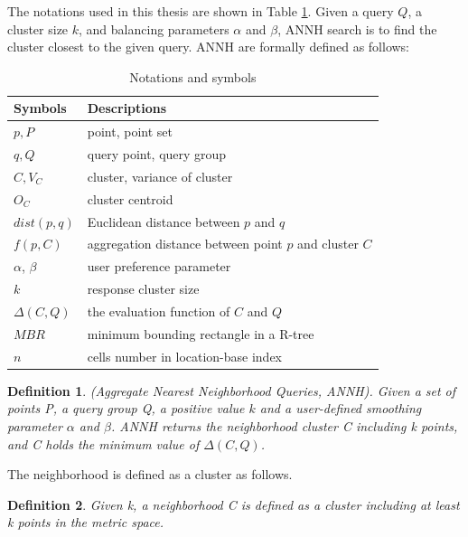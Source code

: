 \documentclass[a4paper,11pt]{report}
\theoremstyle{mytheoremstyle}
\newtheorem{definition}{Definition}
\begin{document}
The notations used in this thesis are shown in Table \ref{tab:var}. Given a query $Q$, a cluster size $k$, and balancing parameters $\alpha$ and $\beta$, ANNH search is to find the cluster closest to the given query. ANNH are formally defined as follows:

\begin{table}
  \begin{center}
  \caption{Notations and symbols}
    \begin{tabular}{|l|l|} \hline
      Symbols & Descriptions \\ \hline \hline
      $p, P$ & point, point set \\ \hline
      $q, Q$ & query point, query group \\ \hline
      $C, V_C$ & cluster, variance of cluster \\ \hline
      $O_C$ & cluster centroid \\ \hline
      $dist(p,q)$ & Euclidean distance between $p$ and $q$ \\ \hline
      $f(p, C)$  & aggregation distance between point $p$ and cluster $C$ \\ \hline
      $\alpha$, $\beta$ & user preference parameter \\ \hline
      $k$ & response cluster size \\ \hline
      $\Delta(C,Q)$ & the evaluation function of $C$ and $Q$ \\ \hline
      $MBR$ & minimum bounding rectangle in a R-tree \\ \hline
      $n$ & cells number in location-base index \\ \hline
    \end{tabular}
    \label{tab:var}
  \end{center}
\end{table}

\begin{definition}
(Aggregate Nearest Neighborhood Queries, ANNH). Given a set of points P, a query group Q, a positive value $k$ and a user-defined smoothing parameter $\alpha$ and $\beta$. ANNH returns the neighborhood cluster C including k points, and C holds the minimum value of $\Delta(C, Q)$.
\end{definition}

The neighborhood is defined as a cluster as follows.

\begin{definition}
Given k, a neighborhood C is defined as a cluster including at least k points in the metric space.
\end{definition}
\end{document}
